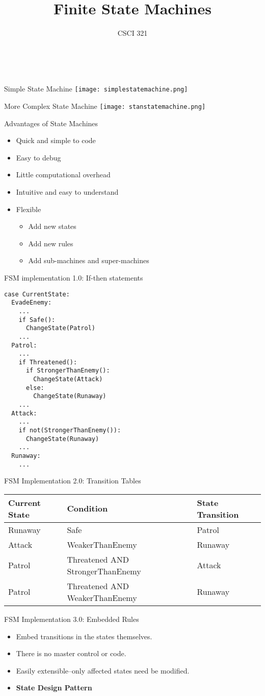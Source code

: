 \documentclass[handout,t,compress]{beamer}
\title{Finite State Machines}
\author{CSCI 321}
\institute{WWU}
\newcommand{\bi}{\begin{itemize}}
\newcommand{\li}{\item}
\newcommand{\ei}{\end{itemize}}
\newcommand{\sect}[1]{\begin{frame}[fragile]{#1}}
\begin{document}
\sect{~}
\titlepage
\end{frame}

\sect{Simple State Machine}
\texttt{[image: simplestatemachine.png]}
\end{frame}

\sect{More Complex State Machine}
\texttt{[image: stanstatemachine.png]}
\end{frame}

\sect{Advantages of State Machines}
\bi
\li Quick and simple to code
\li Easy to debug
\li Little computational overhead
\li Intuitive and easy to understand
\li Flexible
\bi
\li Add new states
\li Add new rules
\li Add sub-machines and super-machines
\ei
\ei
\end{frame}

\sect{FSM implementation 1.0:  If-then statements}
\scriptsize
\begin{Verbatim}
case CurrentState:
  EvadeEnemy:
    ...
    if Safe():
      ChangeState(Patrol)
    ...
  Patrol:
    ...
    if Threatened():
      if StrongerThanEnemy():
        ChangeState(Attack)
      else:
        ChangeState(Runaway)
    ...
  Attack:
    ...
    if not(StrongerThanEnemy()):
      ChangeState(Runaway)
    ...
  Runaway:
    ...  
\end{Verbatim}
\end{frame}

\sect{FSM Implementation 2.0: Transition Tables}
\footnotesize
\begin{tabular}{|l|l|l|}\hline
{\bf Current State} & {\bf Condition} & {\bf State Transition} \\\hline
Runaway & Safe & Patrol\\
Attack & WeakerThanEnemy & Runaway\\
Patrol & Threatened AND StrongerThanEnemy & Attack\\
Patrol & Threatened AND WeakerThanEnemy & Runaway\\\hline
\end{tabular}
\end{frame}

\sect{FSM Implementation 3.0: Embedded Rules}
\begin{itemize}
\item Embed transitions in the states themselves.
\item There is no master control or code.
\item Easily extensible--only affected states need be modified.
\item {\bf State Design Pattern}
\end{itemize}
\end{frame}
\end{document}
